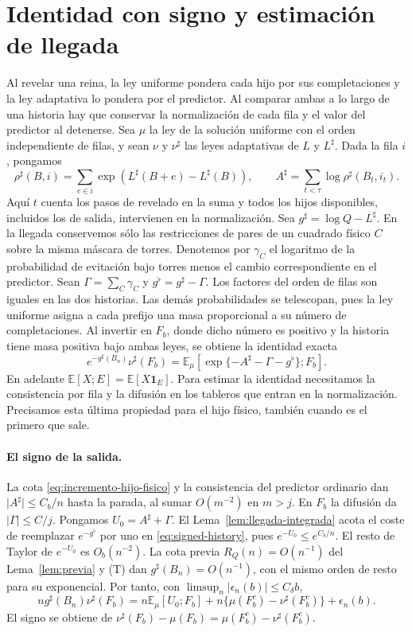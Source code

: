 \section{Identidad con signo y estimación de llegada}\label{app:signed}
Al revelar una reina, la ley uniforme pondera cada hijo por sus completaciones y la ley
adaptativa lo pondera por el predictor. Al comparar ambas a lo largo de una historia hay que
conservar la normalización de cada fila y el valor del predictor al detenerse.
Sea \(\mu\) la ley de la solución uniforme con el orden independiente de filas, y sean \(\nu\)
y \(\nu^\sharp\) las leyes adaptativas de \(L\) y \(L^\sharp\). Dada la fila \(i\), pongamos
\[
 \rho^\sharp(B,i)=\sum_{e\in i}\exp(L^\sharp(B+e)-L^\sharp(B)),\qquad
 A^\sharp=\sum_{t<\tau}\log\rho^\sharp(B_t,i_t).
\]
Aquí \(t\) cuenta los pasos de revelado en la suma y todos los hijos disponibles, incluidos los de salida,
intervienen en la normalización. Sea \(g^\sharp=\log Q-L^\sharp\). En la llegada conservemos
sólo las restricciones de pares de un cuadrado físico \(C\) sobre la misma máscara de torres.
Denotemos por \(\gamma_C\) el logaritmo de la probabilidad de evitación bajo torres menos el
cambio correspondiente en el predictor. Sean \(\Gamma=\sum_C\gamma_C\) y
\(g^\flat=g^\sharp-\Gamma\). Los factores del orden de filas son iguales en las dos historias.
Las demás probabilidades se telescopan, pues la ley uniforme asigna a cada prefijo una masa
proporcional a su número de completaciones. Al invertir en \(F_b\), donde dicho número es
positivo y la historia tiene masa positiva bajo ambas leyes, se obtiene la identidad exacta
\begin{equation}\label{eq:signed-history}
 e^{-g^\sharp(B_n)}\nu^\sharp(F_b)
 =\mathbb E_\mu[\exp\{-A^\sharp-\Gamma-g^\flat\};F_b].
\end{equation}
En adelante \(\mathbb E[X;E]=\mathbb E[X\mathbf1_E]\). Para estimar la identidad necesitamos
la consistencia por fila y la difusión en los tableros que entran en la normalización.
Precisamos esta última propiedad para el hijo físico, también cuando es el primero que sale.


\paragraph{El signo de la salida.}
La cota \eqref{eq:incremento-hijo-fisico} y la consistencia del predictor ordinario dan
\(\lvert A^\sharp\rvert\le C_b/n\) hasta la parada, al sumar \(O(m^{-2})\) en \(m>j\).
En \(F_b\) la difusión da \(|\Gamma|\le C/j\). Pongamos \(U_0=A^\sharp+\Gamma\).
El Lema~\ref{lem:llegada-integrada} acota el coste de reemplazar \(e^{-g^\flat}\) por uno en
\eqref{eq:signed-history}, pues \(e^{-U_0}\le e^{C_b/n}\).
El resto de Taylor de \(e^{-U_0}\) es \(O_b(n^{-2})\).
La cota previa \(R_Q(n)=O(n^{-1})\) del Lema~\ref{lem:previa}
y (T) dan \(g^\sharp(B_n)=O(n^{-1})\), con el mismo orden de resto para su exponencial.
Por tanto, con \(\limsup_n|\epsilon_n(b)|\le C_\delta b\),
\[
 n g^\sharp(B_n)\nu^\sharp(F_b)
 =n\mathbb E_\mu[U_0;F_b]+n\{\mu(F_b^c)-\nu^\sharp(F_b^c)\}+\epsilon_n(b).
\]
El signo se obtiene de \(\nu^\sharp(F_b)-\mu(F_b)=\mu(F_b^c)-\nu^\sharp(F_b^c)\).

